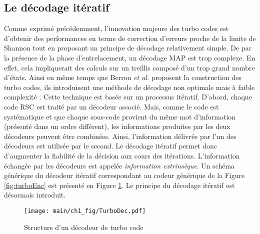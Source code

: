 \subsection{Le décodage itératif}
Comme exprimé précédemment, l'innovation majeure des turbo codes est d'obtenir des performances en terme de correction 
d'erreurs proche de la limite de Shannon tout en proposant un principe de décodage relativement simple. De par la présence 
de la phase d'entrelacement, un décodage MAP est trop complexe. En effet, cela impliquerait des calculs sur un treillis 
composé d'un trop grand nombre d'états. Ainsi en même temps que Berrou \textit{et al.} proposent la construction des turbo 
codes, ils introduisent une méthode de décodage non optimale mais à faible complexité \cite{berrouTC}. Cette technique est 
basée sur un processus itératif. D'abord, chaque code RSC est traité par un décodeur associé. Mais, comme le code est systématique 
et que chaque sous-code provient du même mot d'information (présenté dans un ordre différent), les informations produites 
par les deux décodeurs peuvent être combinées. Ainsi, l'information délivrée par l'un des décodeurs est utilisée par le 
second. Le décodage itératif permet donc d'augmenter la fiabilité de la décision aux cours des itérations. L'information 
échangée par les décodeurs est appelée \emph{information extrinsèque}. Un schéma générique du décodeur itératif correspondant 
au codeur générique de la Figure \ref{fig:turboEnc} est présenté en Figure \ref{fig:turboDec}. Le principe du décodage itératif 
est désormais introduit.

\begin{figure}[!h]
	\centering
	\texttt{[image: main/ch1\_fig/TurboDec.pdf]}
	\caption{\label{fig:turboDec} Structure d'un décodeur de turbo code}
\end{figure}

%
	
	

